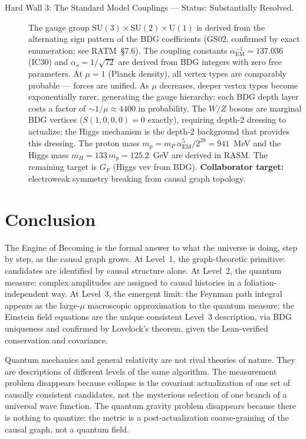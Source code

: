 \documentclass[11pt,a4paper]{article}
\theoremstyle{plain}
\theoremstyle{definition}
\theoremstyle{remark}
\begin{document}
\begin{description}
  \item[Hard Wall 3: The Standard Model Couplings --- Status: Substantially Resolved.]
  The gauge group $\mathrm{SU}(3) \times \mathrm{SU}(2) \times \mathrm{U}(1)$
  is derived from the alternating sign pattern of the BDG coefficients
  (GS02, confirmed by exact enumeration; see RATM~\S7.6). The coupling
  constants $\alpha_{\mathrm{EM}}^{-1} = 137.036$ (IC30) and
  $\alpha_s = 1/\sqrt{72}$ are derived from BDG integers with zero free
  parameters. At $\mu = 1$ (Planck density), all vertex types are
  comparably probable --- forces are unified. As $\mu$ decreases,
  deeper vertex types become exponentially rarer, generating the gauge
  hierarchy: each BDG depth layer costs a factor of ${\sim}1/\mu
  \approx 4400$ in probability. The $W/Z$ bosons are marginal BDG
  vertices ($S(1,0,0,0) = 0$ exactly), requiring depth-2 dressing to
  actualize; the Higgs mechanism is the depth-2 background that provides
  this dressing. The proton mass $m_p = m_P\,\alpha_{\mathrm{EM}}^5/2^{28}
  = 941$~MeV and the Higgs mass $m_H = 133\,m_p = 125.2$~GeV are
  derived in RASM. The remaining target is $G_F$ (Higgs vev from BDG).
  \textbf{Collaborator target:} electroweak symmetry breaking from causal
  graph topology.
\end{description}

\section{Conclusion}
\label{sec:conclusion}

The Engine of Becoming is the formal answer to what the universe is doing,
step by step, as the causal graph grows. At Level~1, the graph-theoretic
primitive: candidates are identified by causal structure alone. At Level~2,
the quantum measure: complex amplitudes are assigned to causal histories in a
foliation-independent way. At Level~3, the emergent limit: the Feynman path integral appears as the large-$\mu$ macroscopic
approximation to the quantum measure; the Einstein field equations are
the unique consistent Level~3 description, via BDG uniqueness and
confirmed by Lovelock's theorem, given the Lean-verified conservation and covariance.

Quantum mechanics and general relativity are not rival theories of nature.
They are descriptions of different levels of the same algorithm. The
measurement problem disappears because collapse is the covariant actualization
of one set of causally consistent candidates, not the mysterious selection of
one branch of a universal wave function. The quantum gravity problem
disappears because there is nothing to quantize: the metric is a
post-actualization coarse-graining of the causal graph, not a quantum field.
\end{document}

